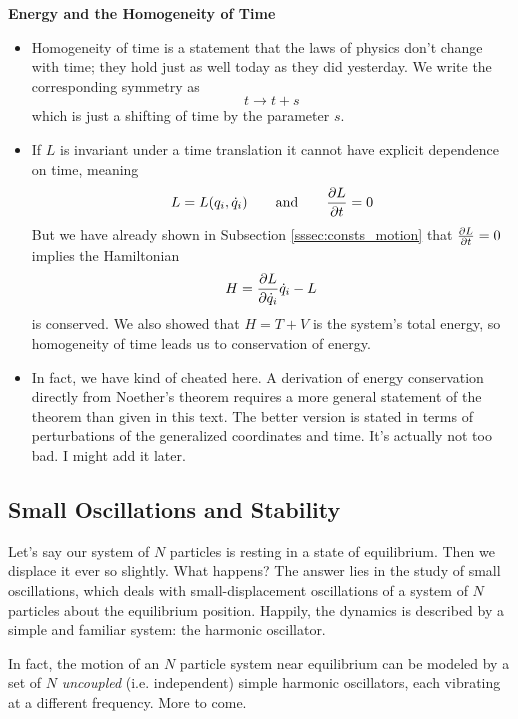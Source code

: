 \documentclass[11pt, a4paper]{article}
\newcommand{\eqtext}[1]{\qquad \text{#1} \qquad}
\begin{document}
\textbf{Energy and the Homogeneity of Time}
\begin{itemize}
	\item Homogeneity of time is a statement that the laws of physics don't change with time; they hold just as well today as they did yesterday. We write the corresponding symmetry as 
	\begin{equation*}
		t \to t + s
	\end{equation*}
	which is just a shifting of time by the parameter $ s $. 
	
	\item If $ L $ is invariant under a time translation it cannot have explicit dependence on time, meaning
	\begin{equation*}
		L = L(q_{i}, \dot{q}_{i}) \eqtext{and} \pdv{L}{t} = 0
	\end{equation*}
	But we have already shown in Subsection \ref{sssec:consts_motion} that $ \pdv{L}{t} = 0 $ implies the Hamiltonian 
	\begin{equation*}
		H = \pdv{L}{\dot{q}_{i}}\dot{q}_{i} - L
	\end{equation*}
	is conserved. We also showed that $ H = T + V$ is the system's total energy, so homogeneity of time leads us to conservation of energy. 
	
	\item In fact, we have kind of cheated here. A derivation of energy conservation directly from Noether's theorem requires a more general statement of the theorem than given in this text. The better version is stated in terms of perturbations of the generalized coordinates and time. It's actually not too bad. I might add it later.
	
\end{itemize}


\subsection{Small Oscillations and Stability}
Let's say our system of $ N $ particles is resting in a state of equilibrium. Then we displace it ever so slightly. What happens? The answer lies in the study of small oscillations, which deals with small-displacement oscillations of a system of $ N $ particles about the equilibrium position. Happily, the dynamics is described by a simple and familiar system: the harmonic oscillator. 
	
In fact, the motion of an $ N $ particle system near equilibrium can be modeled by a set of $ N $ \textit{uncoupled} (i.e. independent) simple harmonic oscillators, each vibrating at a different frequency. More to come.
\end{document}
